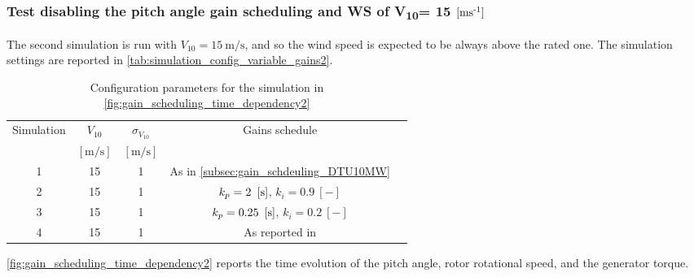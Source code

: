 \subsubsection[$V_{10}=15 \, \si{\meter\per\second}$]{Test disabling the pitch angle gain scheduling and WS of V\textsubscript{10}= 15 $\left[ \text{ms}\textsuperscript{-1} \right]$}
The second simulation is run with $V_{10}=15 \ \si{\meter\per\second}$, and so the wind speed is expected to be always above the rated one. The simulation settings are reported in \autoref{tab:simulation_config_variable_gains2}.
\begin{table}[htb]
  \caption{Configuration parameters for the simulation in \autoref{fig:gain_scheduling_time_dependency2}}
  \centering
  \begin{tabular}{ccccc}
  \toprule
    Simulation & $V_{10}$  & $\sigma_{V_{10}}$ & Gains schedule \\ 
     & $\left[\si{\meter\per\second}\right]$ & $\left[\si{\meter\per\second}\right]$ & \\ \midrule       
     1 & 15 & 1 & As in \autoref{subsec:gain_schdeuling_DTU10MW}  \\
     2 & 15 & 1 & $k_p = 2 \ \mesunt{\second}$, $k_i=0.9 \ [-]$ \\
     3 & 15 & 1 & $k_p = 0.25 \ \mesunt{\second}$, $k_i=0.2 \ [-]$  \\
     4 & 15 & 1 & As reported in \cite{Olimpo_Anaya‐Lara}  \\
     \bottomrule
  \end{tabular}
  \label{tab:simulation_config_variable_gains2}
\end{table}

\autoref{fig:gain_scheduling_time_dependency2} reports the time evolution of the pitch angle, rotor rotational speed, and the generator torque. 

